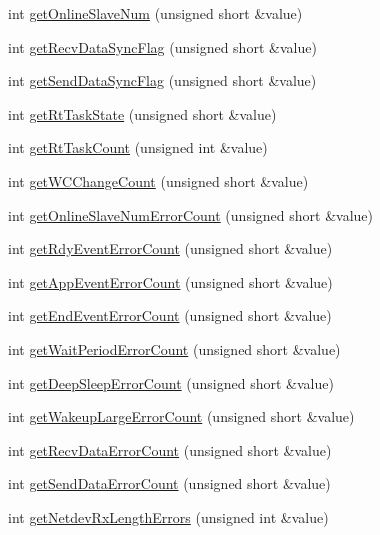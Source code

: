 \begin{DoxyCompactItemize}
int \hyperlink{classCUIEcat_a4a6ae9ad418142c1e048686063eab64d}{get\-Online\-Slave\-Num} (unsigned short \&value)
\item 
int \hyperlink{classCUIEcat_adb62f962a8c635ec3d2415ec633962b4}{get\-Recv\-Data\-Sync\-Flag} (unsigned short \&value)
\item 
int \hyperlink{classCUIEcat_ade912206b11398d47efc697e8ce92a20}{get\-Send\-Data\-Sync\-Flag} (unsigned short \&value)
\item 
int \hyperlink{classCUIEcat_a63e237aae8398d348bf306a32644eac4}{get\-Rt\-Task\-State} (unsigned short \&value)
\item 
int \hyperlink{classCUIEcat_afa6be9b91db04dd2f80dc0abc401a305}{get\-Rt\-Task\-Count} (unsigned int \&value)
\item 
int \hyperlink{classCUIEcat_aba200a70bcdff42fad9ec5faef6017ad}{get\-W\-C\-Change\-Count} (unsigned short \&value)
\item 
int \hyperlink{classCUIEcat_affb9c24adc1110db865fe12a205c9e75}{get\-Online\-Slave\-Num\-Error\-Count} (unsigned short \&value)
\item 
int \hyperlink{classCUIEcat_a63b3686e23653058635c9d7c1cf26252}{get\-Rdy\-Event\-Error\-Count} (unsigned short \&value)
\item 
int \hyperlink{classCUIEcat_a20d8ed1c0b3d2cafbd98864f969677a5}{get\-App\-Event\-Error\-Count} (unsigned short \&value)
\item 
int \hyperlink{classCUIEcat_a49fba779055b9959e804b3d6587f9799}{get\-End\-Event\-Error\-Count} (unsigned short \&value)
\item 
int \hyperlink{classCUIEcat_a721382e4e2624ec021cda4a173b5fa6c}{get\-Wait\-Period\-Error\-Count} (unsigned short \&value)
\item 
int \hyperlink{classCUIEcat_a8957db458414aa0a3d4e8af9167b5a63}{get\-Deep\-Sleep\-Error\-Count} (unsigned short \&value)
\item 
int \hyperlink{classCUIEcat_a7cd108133cfbb78d08fec432de8d79f4}{get\-Wakeup\-Large\-Error\-Count} (unsigned short \&value)
\item 
int \hyperlink{classCUIEcat_a757185f20d3546f9e08b9872a3d9a6ef}{get\-Recv\-Data\-Error\-Count} (unsigned short \&value)
\item 
int \hyperlink{classCUIEcat_a222786b3092fb16b3663b03fdbc11af6}{get\-Send\-Data\-Error\-Count} (unsigned short \&value)
\item 
int \hyperlink{classCUIEcat_ab9db5ac7dfc636819b1ece43d35ba7f4}{get\-Netdev\-Rx\-Length\-Errors} (unsigned int \&value)
\item 

\end{DoxyCompactItemize}
